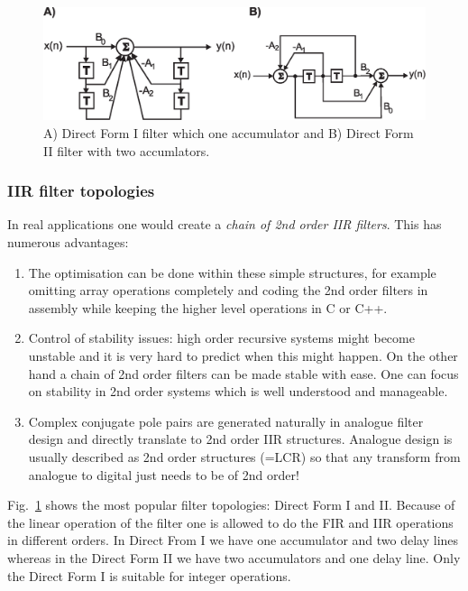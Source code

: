 \documentclass[12pt,a4paper]{article}
\begin{document}
\begin{figure}[!hbt]
\begin{center}
\mbox{\includegraphics[width=\textwidth]{iir_types}}
\end{center}
\caption{A) Direct Form I filter which one accumulator and
  B) Direct Form II filter with two accumlators.
\label{iir_types}}
\end{figure}


\subsubsection{IIR filter topologies}
In real applications one would create a \textsl{chain of 2nd order
IIR filters}. This has numerous advantages:
\begin{enumerate}
\item The optimisation can be done within these simple structures,
  for example omitting array operations completely and coding
  the 2nd order filters in assembly while keeping the higher
  level operations in C or C++.
\item Control of stability issues: high order recursive
  systems might become unstable and it is very hard to predict
  when this might happen. On the other hand a chain of 2nd order
  filters can be made stable with ease. One can focus on
  stability in 2nd order systems which is well understood and
  manageable.
\item Complex conjugate pole pairs are generated naturally
  in analogue filter design and directly translate to 2nd
  order IIR structures. Analogue design is usually described
  as 2nd order structures (=LCR) so that any transform from analogue
  to digital just needs to be of 2nd order!
\end{enumerate}

Fig.~\ref{iir_types} shows the most popular filter topologies:
Direct Form I and II. Because of the linear operation of the filter
one is allowed to do the FIR and IIR operations in different orders.
In Direct From I we have one accumulator and two delay lines whereas
in the Direct Form II we have two accumulators and one delay line.
Only the Direct Form I is suitable for integer operations.
\end{document}
